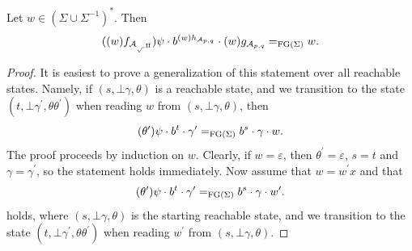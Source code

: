 \begin{lemma}%
  \label{lem:Stallings_automaton_product}
  \rocqok{}
  Let $w\in {\left(\Sigma \cup \Sigma^{-1}\right)}^\ast$.
  Then 
  \[ ((w)f_{\mathcal{A_{p, q}}})\psi \cdot b^{(w)h_{\mathcal{A}_{p, q}}} \cdot (w)g_{\mathcal{A}_{p, q}} =_{\textrm{FG}(\Sigma)} w. \]
\end{lemma}
\begin{proof}
  \rocqok{}
  It is easiest to prove a generalization of this statement over all reachable states. Namely, if
  $(s, \bot \gamma, \theta)$ is a reachable state, and we transition to the state
  $(t, \bot \gamma^\prime, \theta\theta^\prime)$ when reading $w$ from $(s, \bot \gamma, \theta)$, then
  \[
    (\theta^\prime)\psi \cdot b^{t} \cdot \gamma^\prime =_{\textrm{FG}(\Sigma)} b^s \cdot \gamma \cdot w.
  \]
  The proof proceeds by induction on $w$.
  Clearly, if $w = \varepsilon$, then $\theta^\prime = \varepsilon$, $s = t$ and $\gamma = \gamma^\prime$, so
  the statement holds immediately.
  Now assume that $w = w^\prime x$ and that
  \[
    (\theta^\prime)\psi \cdot b^{t} \cdot \gamma^\prime =_{\textrm{FG}(\Sigma)} b^s \cdot \gamma \cdot w^\prime.
  \]
  holds, where $(s, \bot \gamma, \theta)$ is the starting reachable state, and we transition to the state
  $(t, \bot \gamma^\prime, \theta\theta^\prime)$ when reading $w^\prime$ from $(s, \bot \gamma, \theta)$.


\end{proof}
